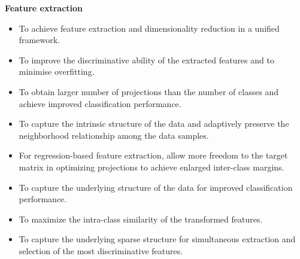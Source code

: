 %
\noindent\textbf{Feature extraction}
%
\begin{itemize}
    \item To achieve feature extraction and dimensionality reduction in a unified framework. 
    \item To improve the discriminative ability of the extracted features and to minimise overfitting. 
    \item To obtain larger number of projections than the number of classes and achieve improved classification performance.
    \item To capture the intrinsic structure of the data and adaptively preserve the neighborhood relationship among the data samples.
    \item For regression-based feature extraction, allow more freedom to the target matrix in optimizing projections to achieve enlarged inter-class margins.
    \item To capture the underlying structure of the data for improved classification performance.
    \item To maximize the intra-class similarity of the transformed features.
    \item To capture the underlying sparse structure for simultaneous extraction and selection of the most discriminative features. 
\end{itemize}

